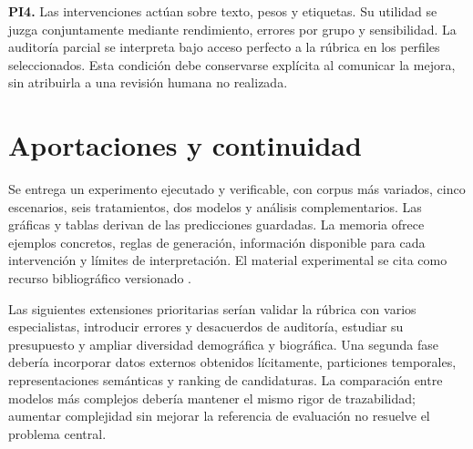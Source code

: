 \documentclass[11pt,a4paper,oneside]{report}
\begin{document}
\textbf{PI4.} Las intervenciones actúan sobre texto, pesos y etiquetas. Su utilidad se juzga conjuntamente mediante rendimiento, errores por grupo y sensibilidad. La auditoría parcial se interpreta bajo acceso perfecto a la rúbrica en los perfiles seleccionados. Esta condición debe conservarse explícita al comunicar la mejora, sin atribuirla a una revisión humana no realizada.

\section{Aportaciones y continuidad}
Se entrega un experimento ejecutado y verificable, con corpus más variados, cinco escenarios, seis tratamientos, dos modelos y análisis complementarios. Las gráficas y tablas derivan de las predicciones guardadas. La memoria ofrece ejemplos concretos, reglas de generación, información disponible para cada intervención y límites de interpretación. El material experimental se cita como recurso bibliográfico versionado \cite{repositorio2026}.

Las siguientes extensiones prioritarias serían validar la rúbrica con varios especialistas, introducir errores y desacuerdos de auditoría, estudiar su presupuesto y ampliar diversidad demográfica y biográfica. Una segunda fase debería incorporar datos externos obtenidos lícitamente, particiones temporales, representaciones semánticas y ranking de candidaturas. La comparación entre modelos más complejos debería mantener el mismo rigor de trazabilidad; aumentar complejidad sin mejorar la referencia de evaluación no resuelve el problema central.
\end{document}
